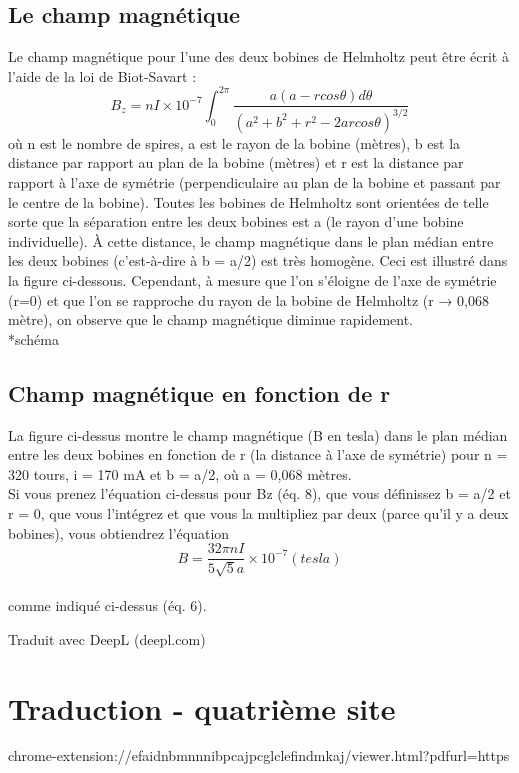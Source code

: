 \documentclass[../main.tex]{subfiles}
\begin{document}
 \subsection{Le champ magnétique}
Le champ magnétique pour l'une des deux bobines de Helmholtz peut être écrit à l'aide de la loi de Biot-Savart :\\
$$B_z = nI \times 10^{-7}\int_0^{2\pi}\frac{a(a -rcos\theta) d\theta}{(a^2 + b^2 + r^2 - 2arcos\theta)^{3/2}}$$ où n est le nombre de spires, a est le rayon de la bobine (mètres), b est la distance par rapport au plan de la bobine (mètres) et r est la distance par rapport à l'axe de symétrie (perpendiculaire au plan de la bobine et passant par le centre de la bobine).  Toutes les bobines de Helmholtz sont orientées de telle sorte que la séparation entre les deux bobines est a (le rayon d'une bobine individuelle).  À cette distance, le champ magnétique dans le plan médian entre les deux bobines (c'est-à-dire à b = a/2) est très homogène.  Ceci est illustré dans la figure ci-dessous.  Cependant, à mesure que l'on s'éloigne de l'axe de symétrie (r=0) et que l'on se rapproche du rayon de la bobine de Helmholtz (r → 0,068 mètre), on observe que le champ magnétique diminue rapidement. \\
*schéma\\
\subsection{Champ magnétique en fonction de r}
La figure ci-dessus montre le champ magnétique (B en tesla) dans le plan médian entre les deux bobines en fonction de r (la distance à l'axe de symétrie) pour n = 320 tours, i = 170 mA et b = a/2, où a = 0,068 mètres.\\
Si vous prenez l'équation ci-dessus pour Bz (éq. 8), que vous définissez b = a/2 et r = 0, que vous l'intégrez et que vous la multipliez par deux (parce qu'il y a deux bobines), vous obtiendrez l'équation\\
$$B = \frac{32 \pi n I}{5 \sqrt{5}a} \times 10^{-7} (tesla)$$ \\
comme indiqué ci-dessus (éq. 6). 


Traduit avec DeepL (deepl.com)

\section{Traduction - quatrième site}
chrome-extension://efaidnbmnnnibpcajpcglclefindmkaj/viewer.html?pdfurl=https%
\end{document}
